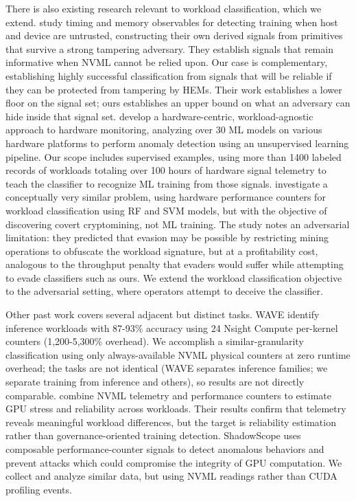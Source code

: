 There is also existing research relevant to workload classification, which we extend. \citet{monfared2026} study timing and memory observables for detecting training when host and device are untrusted, constructing their own derived signals from primitives that survive a strong tampering adversary. They establish signals that remain informative when NVML cannot be relied upon. Our case is complementary, establishing highly successful classification from signals that will be reliable if they can be protected from tampering by HEMs. Their work establishes a lower floor on the signal set; ours establishes an upper bound on what an adversary can hide inside that signal set. \citet{chen2025b} develop a hardware-centric, workload-agnostic approach to hardware monitoring, analyzing over 30 ML models on various hardware platforms to perform anomaly detection using an unsupervised learning pipeline. Our scope includes supervised examples, using more than 1400 labeled records of workloads totaling over 100 hours of hardware signal telemetry to teach the classifier to recognize ML training from those signals. \citet{gangwal2019} investigate a conceptually very similar problem, using hardware performance counters for workload classification using RF and SVM models, but with the objective of discovering covert cryptomining, not ML training. The study notes an adversarial limitation: they predicted that evasion may be possible by restricting mining operations to obfuscate the workload signature, but at a profitability cost, analogous to the throughput penalty that evaders would suffer while attempting to evade classifiers such as ours. We extend the workload classification objective to the adversarial setting, where operators attempt to deceive the classifier.

Other past work covers several adjacent but distinct tasks. WAVE \citep{xu2026} identify inference workloads with 87-93\% accuracy using 24 Nsight Compute per-kernel counters (1,200-5,300\% overhead). We accomplish a similar-granularity classification using only always-available NVML physical counters at zero runtime overhead; the tasks are not identical (WAVE separates inference families; we separate training from inference and others), so results are not directly comparable. \citet{esposito2025} combine NVML telemetry and performance counters to estimate GPU stress and reliability across workloads. Their results confirm that telemetry reveals meaningful workload differences, but the target is reliability estimation rather than governance-oriented training detection. ShadowScope \citep{almusaddar2025} uses composable performance-counter signals to detect anomalous behaviors and prevent attacks which could compromise the integrity of GPU computation. We collect and analyze similar data, but using NVML readings rather than CUDA profiling events.

